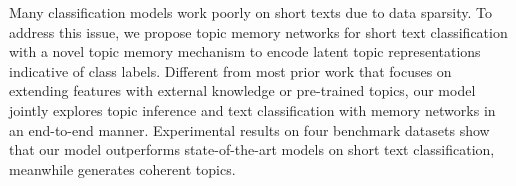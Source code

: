 Many classification models work poorly on short texts due to data sparsity. To address this issue, we propose topic memory networks for short text classification with a novel topic memory mechanism to encode latent topic representations indicative of class labels. Different from most prior work that focuses on extending features with external knowledge or pre-trained topics, our model jointly explores topic inference and text classification with memory networks in an end-to-end manner. Experimental results on four benchmark datasets show that our model outperforms state-of-the-art models on short text classification, meanwhile generates coherent topics.
